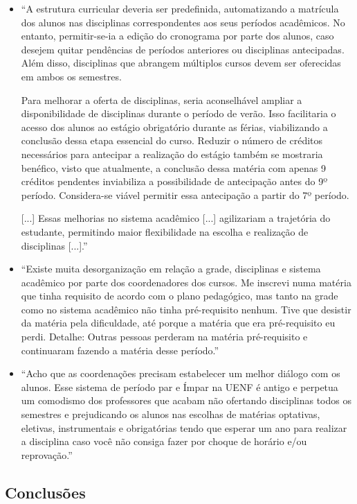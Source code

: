 \begin{itemize}
  \item ``A estrutura curricular deveria ser predefinida, automatizando a matrícula dos alunos nas disciplinas correspondentes aos seus períodos acadêmicos. No entanto, permitir-se-ia a edição do cronograma por parte dos alunos, caso desejem quitar pendências de períodos anteriores ou disciplinas antecipadas. Além disso, disciplinas que abrangem múltiplos cursos devem ser oferecidas em ambos os semestres.

        Para melhorar a oferta de disciplinas, seria aconselhável ampliar a disponibilidade de disciplinas durante o período de verão. Isso facilitaria o acesso dos alunos ao estágio obrigatório durante as férias, viabilizando a conclusão dessa etapa essencial do curso. Reduzir o número de créditos necessários para antecipar a realização do estágio também se mostraria benéfico, visto que atualmente, a conclusão dessa matéria com apenas 9 créditos pendentes inviabiliza a possibilidade de antecipação antes do 9º período. Considera-se viável permitir essa antecipação a partir do 7º período.

        [...]
        Essas melhorias no sistema acadêmico [...] agilizariam a trajetória do estudante, permitindo maior flexibilidade na escolha e realização de disciplinas [...].''
  \item ``Existe muita desorganização em relação a grade, disciplinas e sistema acadêmico por parte dos coordenadores dos cursos. Me inscrevi numa matéria que tinha requisito de acordo com o plano pedagógico, mas tanto na grade como no sistema acadêmico não tinha pré-requisito nenhum. Tive que desistir da matéria pela dificuldade, até porque a matéria que era pré-requisito eu perdi. Detalhe: Outras pessoas perderam na matéria pré-requisito e continuaram fazendo a matéria desse período.''
  \item ``Acho que as coordenações precisam estabelecer um melhor diálogo com os alunos. Esse sistema de período par e Ímpar na UENF é antigo e perpetua um comodismo dos professores que acabam não ofertando disciplinas todos os semestres e prejudicando os alunos nas escolhas de matérias optativas, eletivas, instrumentais e obrigatórias tendo que esperar um ano para realizar a disciplina caso você não consiga fazer por choque de horário e/ou reprovação.''
\end{itemize}

\subsection{Conclusões} %

